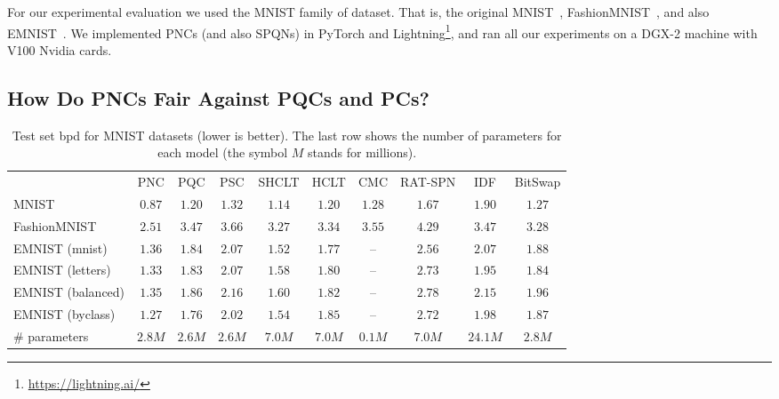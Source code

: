 \documentclass[letterpaper]{article} %
\begin{document}


For our experimental evaluation we used the MNIST family of dataset. That is, the original MNIST~\citep{deng2012mnist}, FashionMNIST~\citep{xiao2017fashion}, and also EMNIST~\citep{cohen2017emnist}.
We implemented PNCs (and also SPQNs) in PyTorch and Lightning\footnote{\url{https://lightning.ai/}}, and ran all our experiments on a DGX-2 machine with V100 Nvidia cards.

\subsection{How Do PNCs Fair Against PQCs and PCs?}
\label{sec:q1}





\begin{table*}[t]
    \footnotesize
    \centering
    \begin{tabular}{lccccccccc}
                          & PNC             & PQC    & PSC    & SHCLT  & HCLT   & CMC    & RAT-SPN & IDF     & BitSwap \\
        \cmidrule(lr){2-4}
        \cmidrule(lr){5-10}
        MNIST             & $\mathbf{0.87}$ & $1.20$ & $1.32$ & $1.14$ & $1.20$ & $1.28$ & $1.67$  & $1.90$  & $1.27$  \\
        FashionMNIST      & $\mathbf{2.51}$ & $3.47$ & $3.66$ & $3.27$ & $3.34$ & $3.55$ & $4.29$  & $3.47$  & $3.28$  \\
        EMNIST (mnist)    & $\mathbf{1.36}$ & $1.84$ & $2.07$ & $1.52$ & $1.77$ & --     & $2.56$  & $2.07$  & $1.88$  \\
        EMNIST (letters)  & $\mathbf{1.33}$ & $1.83$ & $2.07$ & $1.58$ & $1.80$ & --     & $2.73$  & $1.95$  & $1.84$  \\
        EMNIST (balanced) & $\mathbf{1.35}$ & $1.86$ & $2.16$ & $1.60$ & $1.82$ & --     & $2.78$  & $2.15$  & $1.96$  \\
        EMNIST (byclass)  & $\mathbf{1.27}$ & $1.76$ & $2.02$ & $1.54$ & $1.85$ & --     & $2.72$  & $1.98$  & $1.87$  \\
        \midrule
        {\#} parameters   & $2.8M$          & $2.6M$ & $2.6M$ & $7.0M$ & $7.0M$ & $0.1M$ & $7.0M$  & $24.1M$ & $2.8M$  \\
    \end{tabular}
    \caption{Test set bpd for MNIST datasets (lower is better). The last row shows the number of parameters for each model (the symbol $M$ stands for millions).}
    \label{tab:mnist}
\end{table*}
\end{document}
